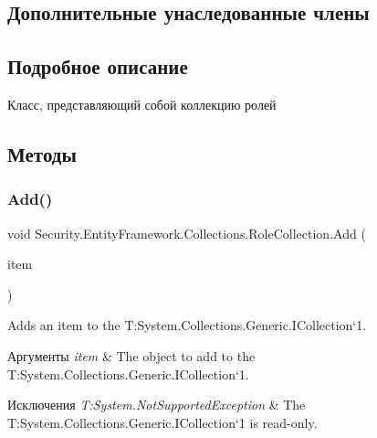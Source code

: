 \subsection*{Дополнительные унаследованные члены}


\subsection{Подробное описание}
Класс, представляющий собой коллекцию ролей 



\subsection{Методы}
\mbox{\label{class_security_1_1_entity_framework_1_1_collections_1_1_role_collection_a98cfc96d025928a994b2a6763a803982}} 
\subsubsection{\texorpdfstring{Add()}{Add()}}
{\footnotesize\ttfamily void Security.\+Entity\+Framework.\+Collections.\+Role\+Collection.\+Add (\begin{DoxyParamCaption}\item[{\hyperlink{interface_security_1_1_interfaces_1_1_model_1_1_i_role}{I\+Role}}]{item }\end{DoxyParamCaption})}



Adds an item to the T\+:\+System.\+Collections.\+Generic.\+I\+Collection`1. 


\begin{DoxyParams}{Аргументы}
{\em item} & The object to add to the T\+:\+System.\+Collections.\+Generic.\+I\+Collection`1.\\
\hline
\end{DoxyParams}

\begin{DoxyExceptions}{Исключения}
{\em T\+:\+System.\+Not\+Supported\+Exception} & The T\+:\+System.\+Collections.\+Generic.\+I\+Collection`1 is read-\/only.\\
\hline
\end{DoxyExceptions}
\mbox{\label{class_security_1_1_entity_framework_1_1_collections_1_1_role_collection_aad5de7562acf3e6b8b44ea8ce6eac19b}} 
